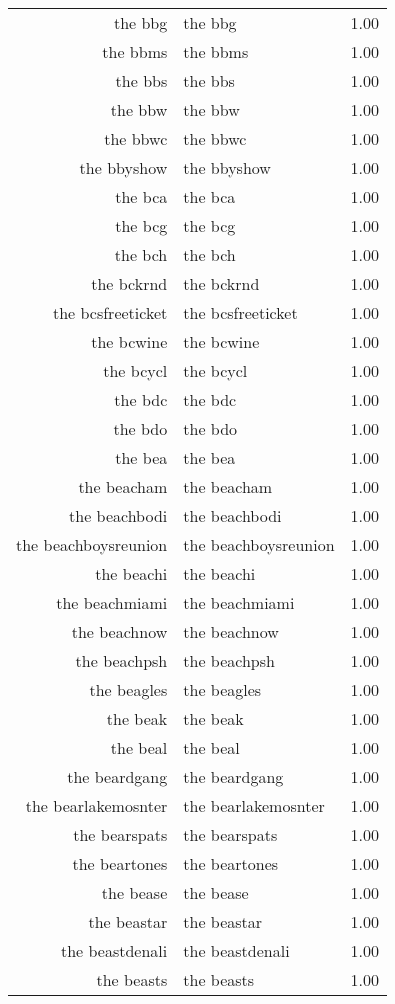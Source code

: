 \begin{table}[ht]
\begin{tabular}{rlr}
  the bbg & the bbg & 1.00 \\ 
  the bbms & the bbms & 1.00 \\ 
  the bbs & the bbs & 1.00 \\ 
  the bbw & the bbw & 1.00 \\ 
  the bbwc & the bbwc & 1.00 \\ 
  the bbyshow & the bbyshow & 1.00 \\ 
  the bca & the bca & 1.00 \\ 
  the bcg & the bcg & 1.00 \\ 
  the bch & the bch & 1.00 \\ 
  the bckrnd & the bckrnd & 1.00 \\ 
  the bcsfreeticket & the bcsfreeticket & 1.00 \\ 
  the bcwine & the bcwine & 1.00 \\ 
  the bcycl & the bcycl & 1.00 \\ 
  the bdc & the bdc & 1.00 \\ 
  the bdo & the bdo & 1.00 \\ 
  the bea & the bea & 1.00 \\ 
  the beacham & the beacham & 1.00 \\ 
  the beachbodi & the beachbodi & 1.00 \\ 
  the beachboysreunion & the beachboysreunion & 1.00 \\ 
  the beachi & the beachi & 1.00 \\ 
  the beachmiami & the beachmiami & 1.00 \\ 
  the beachnow & the beachnow & 1.00 \\ 
  the beachpsh & the beachpsh & 1.00 \\ 
  the beagles & the beagles & 1.00 \\ 
  the beak & the beak & 1.00 \\ 
  the beal & the beal & 1.00 \\ 
  the beardgang & the beardgang & 1.00 \\ 
  the bearlakemosnter & the bearlakemosnter & 1.00 \\ 
  the bearspats & the bearspats & 1.00 \\ 
  the beartones & the beartones & 1.00 \\ 
  the bease & the bease & 1.00 \\ 
  the beastar & the beastar & 1.00 \\ 
  the beastdenali & the beastdenali & 1.00 \\ 
  the beasts & the beasts & 1.00 \\ 

\end{tabular}
\end{table}
